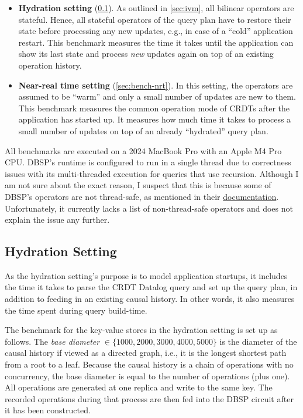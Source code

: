 \begin{itemize}
	\item \textbf{Hydration setting} (\ref{sec:bench-hydration}).
	      As outlined in \ref{sec:ivm}, all bilinear operators are stateful.
	      Hence, all stateful operators of the query plan have to restore
	      their state before processing any new updates, e.g., in case of a
		  ``cold'' application restart. This benchmark measures the time it takes
	      until the application can show its last state and process \emph{new}
		  updates again on top of an existing operation history.
	\item \textbf{Near-real time setting} (\ref{sec:bench-nrt}).
	      In this setting, the operators are assumed to be ``warm'' and only
	      a small number of updates are new to them.
	      This benchmark measures the common operation mode of \acp{CRDT} after
		  the application has started up. It measures how much time it takes
		  to process a small number of updates on top of an already ``hydrated''
		  query plan.
\end{itemize}

All benchmarks are executed on a 2024 MacBook Pro with an Apple M4 Pro CPU.
DBSP's runtime is configured to run in a single thread due to correctness
issues with its multi-threaded execution for queries that use recursion.
Although I am not sure about the exact reason,
I suspect that this is because some of DBSP's operators are not thread-safe,
as mentioned in their
\href{https://docs.rs/dbsp/0.64.0/dbsp/circuit/struct.Runtime.html\#method.init_circuit}{documentation}.
Unfortunately, it currently lacks a list of non-thread-safe operators
and does not explain the issue any further\footnotemark{}.


\subsection{Hydration Setting}\label{sec:bench-hydration}

As the hydration setting's purpose is to model application startups,
it includes the time it takes to parse the \ac{CRDT} Datalog query and
set up the query plan, in addition to feeding in an existing causal history.
In other words, it also measures the time spent during query build-time.

The benchmark for the key-value stores in the hydration setting is set up as follows.
The \emph{base diameter} \(\in \{1000, 2000, 3000, 4000, 5000\}\) is the diameter
of the causal history if viewed as a directed graph,
i.e., it is the longest shortest path from a root to a leaf.
Because the causal history is a chain of operations with no concurrency,
the base diameter is equal to the number of operations (plus one).
All operations are generated at one replica and write to the same key.
The recorded operations during that process are then fed into the DBSP circuit
after it has been constructed.

